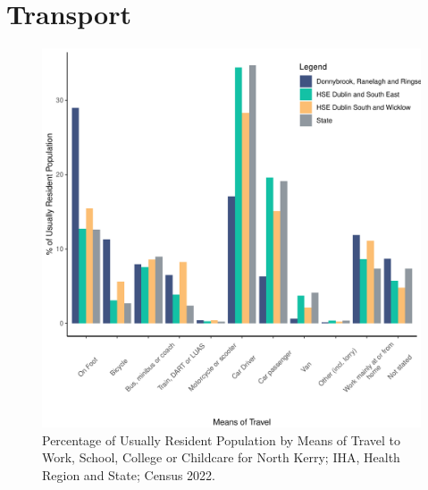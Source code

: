 \documentclass{article}
\begin{document}
\section{Transport}\label{sect:Trans}
\begin{figure}[H]
	\centering
	\includegraphics[width = 120mm]{../figures/TravelED.pdf}
	\caption{Percentage of Usually Resident Population by Means of Travel to Work, School, College or Childcare for North Kerry; IHA, Health Region and State; Census 2022.}
	\label{fig:vbnv}
	\end{figure}
\end{document}
